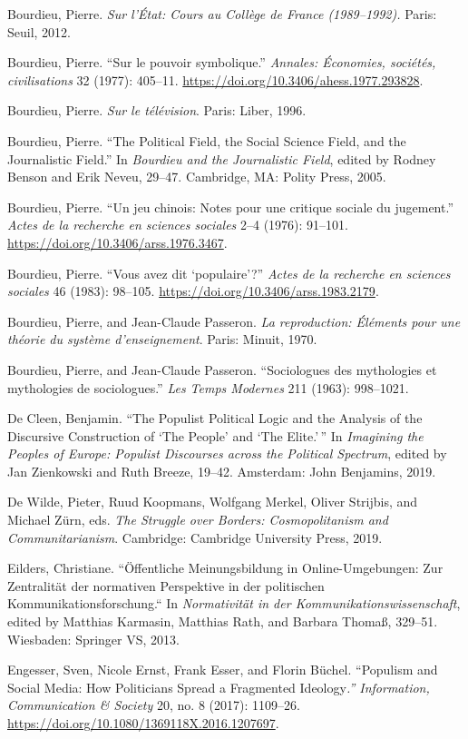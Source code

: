 \documentclass{tufte-handout}
\begin{document}
\begin{hangparas}{.25in}{1}
Bourdieu, Pierre. \emph{Sur l'État: Cours au Collège de France
(1989--1992).} Paris: Seuil, 2012.

Bourdieu, Pierre. ``Sur le pouvoir symbolique.'' \emph{Annales:
Économies, sociétés, civilisations} 32 (1977): 405--11.
\url{https://doi.org/10.3406/ahess.1977.293828}.

Bourdieu, Pierre. \emph{Sur le télévision}. Paris: Liber, 1996.

Bourdieu, Pierre. ``The Political Field, the Social Science Field, and
the Journalistic Field.'' In \emph{Bourdieu and the Journalistic Field},
edited by Rodney Benson and Erik Neveu, 29--47. Cambridge, MA: Polity
Press, 2005.

Bourdieu, Pierre. ``Un jeu chinois: Notes pour une critique sociale du
jugement.'' \emph{Actes de la recherche en sciences sociales} 2--4
(1976): 91--101. \url{https://doi.org/10.3406/arss.1976.3467}.

Bourdieu, Pierre. ``Vous avez dit `populaire'?'' \emph{Actes de la
recherche en sciences sociales} 46 (1983): 98--105.
\url{https://doi.org/10.3406/arss.1983.2179}.

Bourdieu, Pierre, and Jean-Claude Passeron. \emph{La reproduction:
Éléments pour une théorie du système d'enseignement}. Paris: Minuit,
1970.

Bourdieu, Pierre, and Jean-Claude Passeron. ``Sociologues des
mythologies et mythologies de sociologues.'' \emph{Les Temps Modernes}
211 (1963): 998--1021.

De Cleen, Benjamin. ``The Populist Political Logic and the Analysis of
the Discursive Construction of `The People' and `The Elite.'\,'' In
\emph{Imagining the Peoples of Europe: Populist Discourses across the
Political Spectrum}, edited by Jan Zienkowski and Ruth Breeze, 19--42.
Amsterdam: John Benjamins, 2019.

De Wilde, Pieter, Ruud Koopmans, Wolfgang Merkel, Oliver Strijbis, and
Michael Zürn, eds. \emph{The Struggle over Borders: Cosmopolitanism and
Communitarianism}. Cambridge: Cambridge University Press, 2019.

Eilders, Christiane. ``Öffentliche Meinungsbildung in Online-Umgebungen:
Zur Zentralität der normativen Perspektive in der politischen
Kommunikationsforschung.`` In \emph{Normativität in der
Kommunikationswissenschaft}, edited by Matthias Karmasin, Matthias Rath,
and Barbara Thomaß, 329--51. Wiesbaden: Springer VS, 2013.

Engesser, Sven, Nicole Ernst, Frank Esser, and Florin Büchel. ``Populism
and Social Media: How Politicians Spread a Fragmented Ideology\emph{.''
Information, Communication \& Society} 20, no. 8 (2017): 1109--26.
\url{https://doi.org/10.1080/1369118X.2016.1207697}.


\end{hangparas}
\end{document}
